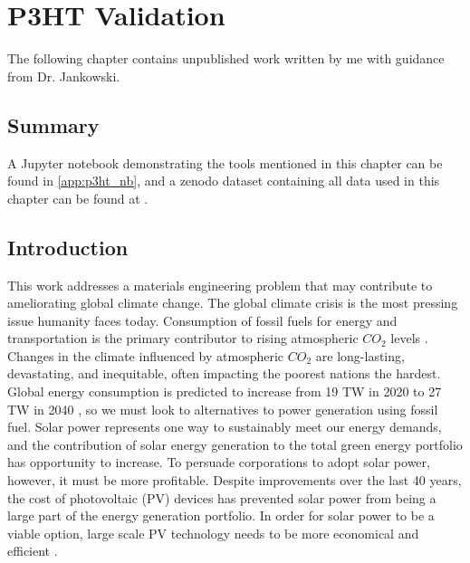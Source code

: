 \chapter{P3HT Validation}
\label{chap:p3ht_validation}

The following chapter contains unpublished work written by me with guidance from Dr. Jankowski.

\section{Summary}
 
A Jupyter notebook demonstrating the tools mentioned in this chapter can be found in \autoref{app:p3ht_nb}, and a zenodo dataset containing all data used in this chapter can be found at \citet{Fothergill2022}.

\section{Introduction}
This work addresses a materials engineering problem that may contribute to ameliorating global climate change.
The global climate crisis is the most pressing issue humanity faces today.
Consumption of fossil fuels for energy and transportation is the primary contributor to rising atmospheric $CO_{2}$ levels \citep{Solomon2009a}.
Changes in the climate influenced by atmospheric $CO_{2}$ are long-lasting, devastating, and inequitable, often impacting the poorest nations the hardest.
Global energy consumption is predicted to increase from 19 TW in 2020 to 27 TW in 2040 \citep{Mazzio2015, ieo2020}, so we must look to alternatives to power generation using fossil fuel.
Solar power represents one way to sustainably meet our energy demands, and the contribution of solar energy generation to the total green energy portfolio has opportunity to increase.
To persuade corporations to adopt solar power, however, it must be more profitable.
Despite improvements over the last 40 years, the cost of photovoltaic (PV) devices has prevented solar power from being a large part of the energy generation portfolio.
In order for solar power to be a viable option, large scale PV technology needs to be more economical and efficient \citep{Mazzio2015, Espinosa2012}.

